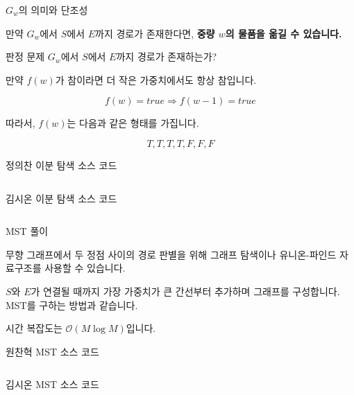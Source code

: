 \begin{frame}{$G_w$의 의미와 단조성}

\footnotesize

만약 $G_w$에서 $S$에서 $E$까지 경로가 존재한다면, \textbf{중량 $w$의 물품을 옮길 수 있습니다.}

\begin{block}{판정 문제}
$G_w$에서 $S$에서 $E$까지 경로가 존재하는가?
\end{block}

만약 $f(w)$가 참이라면 더 작은 가중치에서도 항상 참입니다.

\[
f(w) = true \Rightarrow f(w-1) = true
\]

따라서, $f(w)$는 다음과 같은 형태를 가집니다.

\[
T, T, T, T, F, F, F
\]

\end{frame}

\begin{frame}{정의찬 이분 탐색 소스 코드}
\inputminted{java}{../src/\prob/uichan/BinarySearch.java}
\end{frame}

\begin{frame}{김시온 이분 탐색 소스 코드}
\inputminted{java}{../src/\prob/sion/BinarySearch.java}
\end{frame}

\begin{frame}{MST 풀이}

\footnotesize
무향 그래프에서 두 정점 사이의 경로 판별을 위해 그래프 탐색이나 유니온-파인드 자료구조를 사용할 수 있습니다.

$S$와 $E$가 연결될 때까지 가장 가중치가 큰 간선부터 추가하며 그래프를 구성합니다. MST를 구하는 방법과 같습니다.

시간 복잡도는 $\mathcal{O}(M \log M)$입니다.
\end{frame}

\begin{frame}{원찬혁 MST 소스 코드}
\inputminted{java}{../src/\prob/chanhyeok/Main.java}
\end{frame}

\begin{frame}{김시온 MST 소스 코드}
\inputminted{java}{../src/\prob/sion/MST.java}
\end{frame}




